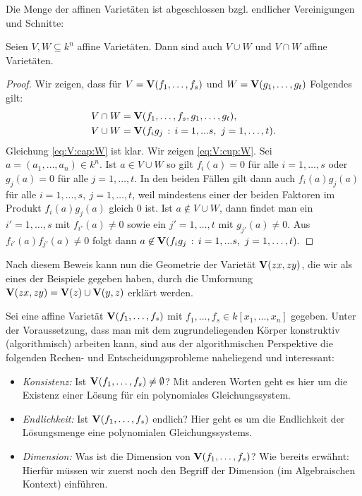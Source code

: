 \documentclass[11pt]{article}
\numberwithin{equation}{section}
\begin{document}
Die Menge der affinen Varietäten ist abgeschlossen bzgl. endlicher Vereinigungen und Schnitte: 

\begin{lemma}
	Seien $V, W \subseteq k^n$ affine Varietäten. Dann sind auch $V \cup W$ und $V \cap W$ affine Varietäten. 
\end{lemma} 
\begin{proof}
	Wir zeigen, dass für $V = \mathbf{V}(f_1,\ldots,f_s)$ und $W = \mathbf{V}(g_1,\ldots,g_t)$ Folgendes gilt: 
	\begin{align}
			V \cap W & = \V(f_1,\ldots,f_s,g_1,\ldots,g_t), \label{eq:V:cap:W}
	\\		V \cup W & = \V( f_i g_j \, : \, i=1,...s,  \ j=1,\ldots,t). \label{eq:V:cup:W}
	\end{align} 
 Gleichung \eqref{eq:V:cap:W} ist klar. Wir zeigen \eqref{eq:V:cup:W}. 
Sei $a =(a_1,\ldots,a_n) \in k^n$. Ist $a \in V \cup W$ so gilt $f_i(a) =0$ für alle $i =1,\ldots,s$ oder $g_j(a) = 0$ für alle $j=1,\ldots,t$. In den beiden Fällen gilt dann auch $f_i(a) g_j(a)$ für alle $i=1,\ldots,s, \ j=1,\ldots,t$, weil mindestens einer der beiden Faktoren im Produkt $f_i(a) g_j(a)$ gleich $0$ ist. Ist $a \not\in V \cup W$, dann findet man ein $i' =1,\ldots, s$ mit $f_{i'}(a) \ne 0$ sowie ein $j' =1,\ldots,t$ mit $g_{j'}(a)  \ne 0$. Aus $f_{i'} (a) f_{j'}(a) \ne 0$ folgt dann $a \not \in \mathbf{V} ( f_i g_j \, : \, i=1,...s,  \ j=1,\ldots,t).$
\end{proof} 

Nach diesem Beweis kann nun die  Geometrie der Varietät $\mathbf{V}(zx,zy)$, die wir als eines der Beispiele gegeben haben, durch die Umformung $\mathbf{V}(zx,zy) = \mathbf{V}(z) \cup \mathbf{V}(y,z)$ erklärt werden. 

Sei eine affine Varietät $\mathbf{V}(f_1,\ldots,f_s)$ mit  $f_1,\ldots,f_s \in k[x_1,\ldots,x_n]$ gegeben. Unter der Voraussetzung, dass man mit dem zugrundeliegenden Körper konstruktiv (algorithmisch) arbeiten kann, 
sind aus der algorithmischen Perspektive die folgenden Rechen- und Entscheidungsprobleme naheliegend und interessant:

\begin{itemize}
	\item[] \emph{Konsistenz:} Ist $\mathbf{V}(f_1,\ldots,f_s) \ne \emptyset$? Mit anderen Worten geht es hier um die Existenz einer Lösung für ein polynomiales Gleichungssystem. 
	\item[]  \emph{Endlichkeit:} Ist $\mathbf{V}(f_1,\ldots,f_s)$ endlich? Hier geht es um die Endlichkeit der Lösungsmenge eine polynomialen Gleichungssystems. 
	\item[] \emph{Dimension:} Was ist die Dimension von $\mathbf{V}(f_1,\ldots,f_s)$? Wie bereits erwähnt: Hierfür müssen wir zuerst noch den Begriff der Dimension (im Algebraischen Kontext) einführen. 
\end{itemize} 
\end{document}
